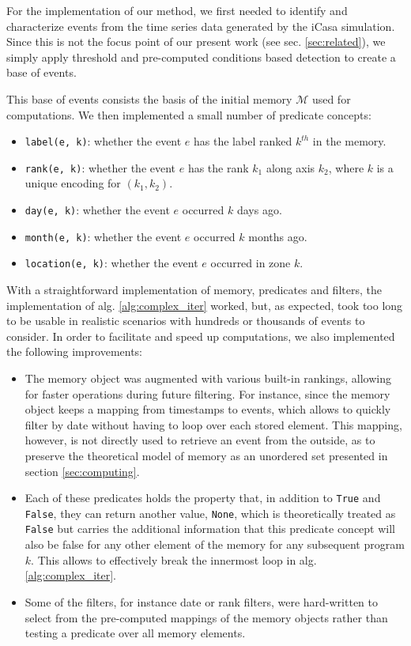 \documentclass[conference]{IEEEtran}
\begin{document}
For the implementation of our method, we first needed to identify and
characterize events from the time series data generated by the iCasa simulation.
Since this is not the focus point of our present work (see sec.
\ref{sec:related}), we simply apply threshold and pre-computed conditions based
detection to create a base of events.

This base of events consists the basis of the initial memory $\mathcal{M}$ used
for computations.
We then implemented a small number of predicate concepts:
\begin{itemize}
        \item \texttt{label(e, k)}: whether the event $e$ has the label ranked
        $k^{th}$ in the memory.
        \item \texttt{rank(e, k)}: whether the event $e$ has the rank $k_{1}$
        along axis $k_{2}$, where $k$ is a unique encoding for $(k_{1}, k_{2})$.
        \item \texttt{day(e, k)}: whether the event $e$ occurred $k$ days ago.
        \item \texttt{month(e, k)}: whether the event $e$ occurred $k$ months
        ago.
        \item \texttt{location(e, k)}: whether the event $e$ occurred in zone
        $k$.
\end{itemize}

With a straightforward implementation of memory, predicates and filters, the
implementation of alg. \ref{alg:complex_iter} worked, but, as expected, took too
long to be usable in realistic scenarios with hundreds or thousands of events to
consider. In order to facilitate and speed up computations, we also implemented
the following improvements:
\begin{itemize}
  \item The memory object was augmented with various built-in rankings, allowing
  for faster operations during future filtering. For instance, since the memory
  object keeps a mapping from timestamps to events, which allows to quickly
  filter by date without having to loop over each stored element. This mapping,
  however, is not directly used to retrieve an event from the outside, as to
  preserve the theoretical model of memory as an unordered set presented in
  section \ref{sec:computing}.

  \item Each of these predicates holds the property that, in addition to
  \texttt{True} and \texttt{False}, they can return another value,
  \texttt{None}, which is theoretically treated as \texttt{False} but carries
  the additional information that this predicate concept will also be false for
  any other element of the memory for any subsequent program $k$. This allows to
  effectively break the innermost loop in alg. \ref{alg:complex_iter}.

  \item Some of the filters, for instance date or rank filters, were
  hard-written to select from the pre-computed mappings of the memory objects
  rather than testing a predicate over all memory elements.
\end{itemize}
\end{document}
